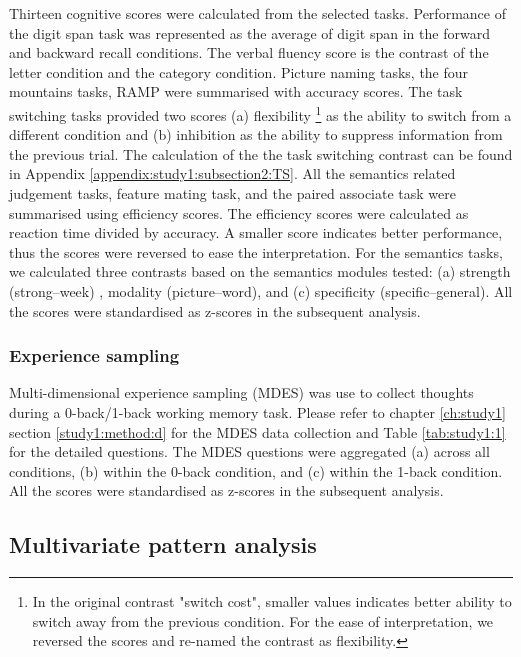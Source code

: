 Thirteen cognitive scores were calculated from the selected tasks. Performance of the digit span task was represented as the average of digit span in the forward and backward recall conditions. The verbal fluency score is the contrast of the letter condition and the category condition. Picture naming tasks, the four mountains tasks, RAMP were summarised with accuracy scores. The task switching tasks provided two scores (a) flexibility
\footnote{
In the original contrast "switch cost", smaller values indicates better ability to switch away from the previous condition. For the ease of interpretation, we reversed the scores and re-named the contrast as flexibility.}
as the ability to switch from a different condition and (b) inhibition as the ability to suppress information from the previous trial. The calculation of the the task switching contrast can be found in Appendix \ref{appendix:study1:subsection2:TS}. All the semantics related judgement tasks, feature mating task, and the paired associate task were summarised using efficiency scores. The efficiency scores were calculated as reaction time divided by accuracy. A smaller score indicates better performance, thus the scores were reversed to ease the interpretation. For the semantics tasks, we calculated three contrasts based on the semantics modules tested: (a) strength (strong--week) , modality (picture--word), and (c) specificity (specific--general). All the scores were standardised as z-scores in the subsequent analysis.

\subsubsection{Experience sampling}
\label{study3:method:e:mdes}
Multi-dimensional experience sampling (MDES) was use to collect thoughts during a 0-back/1-back working memory task. Please refer to chapter \ref{ch:study1} section \ref{study1:method:d} for the MDES data collection and Table \ref{tab:study1:1} for the detailed questions. The MDES questions were aggregated (a) across all conditions, (b) within the 0-back condition, and (c) within the 1-back condition. All the scores were standardised as z-scores in the subsequent analysis.

\subsection{Multivariate pattern analysis}
\label{study3:method:f}
